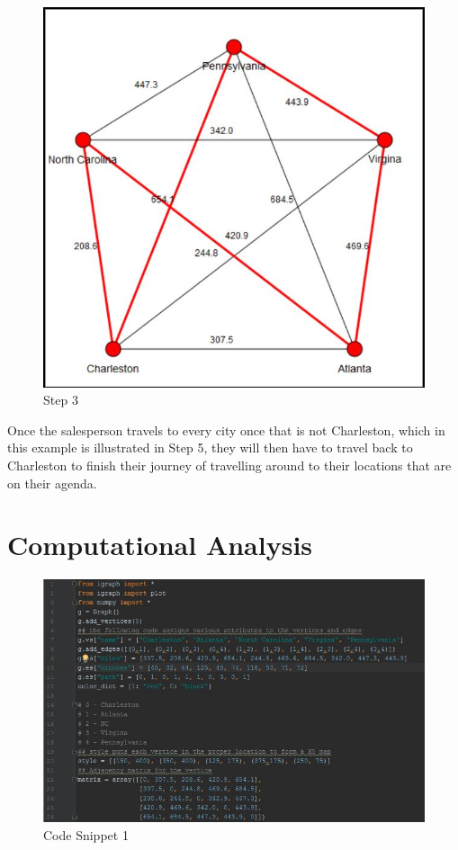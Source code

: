 \documentclass[a4paper,11pt]{scrartcl}
\begin{document}
\begin{figure}[!h]
\begin{minipage}[b]{0.4\textwidth}
    \includegraphics[width=\textwidth]{Step5}
    \caption{Step 3}
  \end{minipage}
\end{figure}

Once the salesperson travels to every city once that is not Charleston, which in this example is illustrated in Step 5, they will then have to travel back to Charleston to finish their journey of travelling around to their locations that are on their agenda.

\section{Computational Analysis}

\begin{figure}[!h]
  \centering
  \begin{minipage}[b]{0.85\textwidth}
    \includegraphics[width=\textwidth]{codepart1}
    \caption{Code Snippet 1}
  \end{minipage}
\end{figure}
\end{document}
